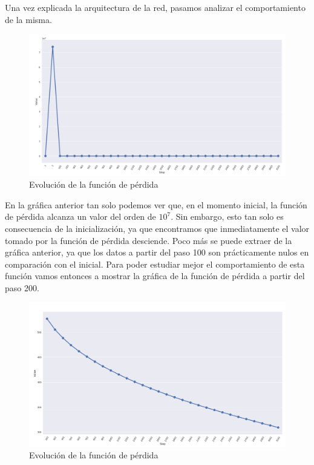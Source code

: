 \documentclass[11pt]{article}
\theoremstyle{plain}
\theoremstyle{definition}
\begin{document}
Una vez explicada la arquitectura de la red, pasamos analizar el 
comportamiento de la misma.

\begin{figure}[H]
  \centering \includegraphics[width=.95\textwidth]{imgs/loss_adam_1}
  \caption{Evolución de la función de pérdida}
\end{figure}

En la gráfica anterior tan solo podemos ver que, en el momento inicial,
la función de pérdida alcanza un valor del orden de $10^7$. Sin embargo,
esto tan solo es consecuencia de la inicialización, ya que encontramos 
que inmediatamente el valor tomado por la función de pérdida desciende.
Poco más se puede extraer de la gráfica anterior, ya que los datos 
a partir del paso 100 son prácticamente nulos en comparación con el 
inicial. Para poder estudiar mejor el comportamiento de esta función 
vamos entonces a mostrar la gráfica de la función de pérdida a partir
del paso 200.

\begin{figure}[H]
  \centering \includegraphics[width=.95\textwidth]{imgs/loss_adam_2}
  \caption{Evolución de la función de pérdida}
\end{figure}
\end{document}
